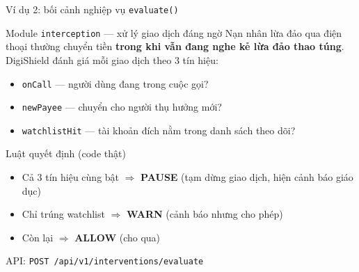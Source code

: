 \documentclass[aspectratio=169,12pt]{beamer}
\begin{document}
\begin{frame}[shrink=8]{Ví dụ 2: bối cảnh nghiệp vụ \texttt{evaluate()}}
  \begin{block}{Module \texttt{interception} --- xử lý giao dịch đáng ngờ}
    Nạn nhân lừa đảo qua điện thoại thường chuyển tiền \textbf{trong khi vẫn
    đang nghe kẻ lừa đảo thao túng}. DigiShield đánh giá mỗi giao dịch theo
    3 tín hiệu:
    \begin{itemize}
      \item \texttt{onCall} --- người dùng đang trong cuộc gọi?
      \item \texttt{newPayee} --- chuyển cho người thụ hưởng mới?
      \item \texttt{watchlistHit} --- tài khoản đích nằm trong danh sách theo dõi?
    \end{itemize}
  \end{block}

  \vspace{0.3em}
  \begin{exampleblock}{Luật quyết định (code thật)}
    \begin{itemize}
      \item Cả 3 tín hiệu cùng bật $\Rightarrow$ \textbf{PAUSE} (tạm dừng giao dịch, hiện cảnh báo giáo dục)
      \item Chỉ trúng watchlist $\Rightarrow$ \textbf{WARN} (cảnh báo nhưng cho phép)
      \item Còn lại $\Rightarrow$ \textbf{ALLOW} (cho qua)
    \end{itemize}
    API: \texttt{POST /api/v1/interventions/evaluate}
  \end{exampleblock}
\end{frame}
\end{document}
